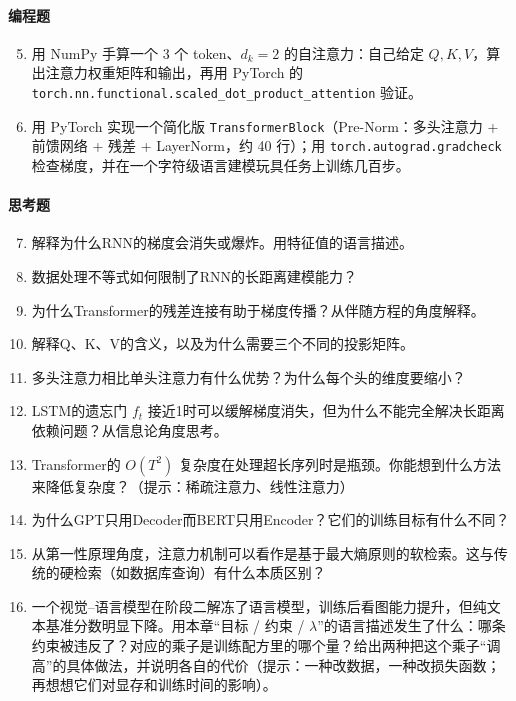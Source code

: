 \paragraph{编程题}
\begin{enumerate}
    \setcounter{enumi}{4}
    \item 用 NumPy 手算一个 3 个 token、$d_k = 2$ 的自注意力：自己给定 $Q, K, V$，算出注意力权重矩阵和输出，再用 PyTorch 的 \texttt{torch.nn.functional.}\allowbreak\texttt{scaled\_dot\_product\_attention} 验证。
    
    \item 用 PyTorch 实现一个简化版 \texttt{TransformerBlock}（Pre-Norm：多头注意力 + 前馈网络 + 残差 + LayerNorm，约 40 行）；用 \texttt{torch.autograd.}\allowbreak\texttt{gradcheck} 检查梯度，并在一个字符级语言建模玩具任务上训练几百步。
\end{enumerate}

\paragraph{思考题}
\begin{enumerate}
    \setcounter{enumi}{6}
    \item 解释为什么RNN的梯度会消失或爆炸。用特征值的语言描述。
    
    \item 数据处理不等式如何限制了RNN的长距离建模能力？
    
    \item 为什么Transformer的残差连接有助于梯度传播？从伴随方程的角度解释。
    
    \item 解释Q、K、V的含义，以及为什么需要三个不同的投影矩阵。
    
    \item 多头注意力相比单头注意力有什么优势？为什么每个头的维度要缩小？
    
    \item LSTM的遗忘门 $f_t$ 接近1时可以缓解梯度消失，但为什么不能完全解决长距离依赖问题？从信息论角度思考。
    
    \item Transformer的 $O(T^2)$ 复杂度在处理超长序列时是瓶颈。你能想到什么方法来降低复杂度？（提示：稀疏注意力、线性注意力）
    
    \item 为什么GPT只用Decoder而BERT只用Encoder？它们的训练目标有什么不同？
    
    \item 从第一性原理角度，注意力机制可以看作是基于最大熵原则的软检索。这与传统的硬检索（如数据库查询）有什么本质区别？
    
    \item 一个视觉--语言模型在阶段二解冻了语言模型，训练后看图能力提升，但纯文本基准分数明显下降。用本章“目标 / 约束 / $\lambda$”的语言描述发生了什么：哪条约束被违反了？对应的乘子是训练配方里的哪个量？给出两种把这个乘子“调高”的具体做法，并说明各自的代价（提示：一种改数据，一种改损失函数；再想想它们对显存和训练时间的影响）。
\end{enumerate}
